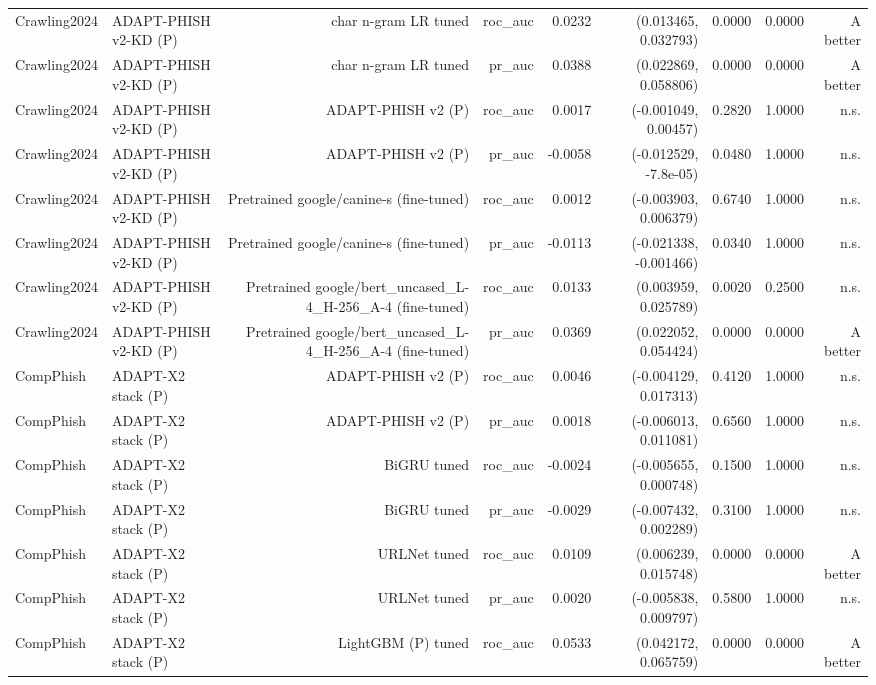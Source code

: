 \begin{table}[t]
\begin{tabular}{llrrrrrrr}
Crawling2024 & ADAPT-PHISH v2-KD (P) & char n-gram LR tuned & roc\_auc & 0.0232 & (0.013465, 0.032793) & 0.0000 & 0.0000 & A better \\
Crawling2024 & ADAPT-PHISH v2-KD (P) & char n-gram LR tuned & pr\_auc & 0.0388 & (0.022869, 0.058806) & 0.0000 & 0.0000 & A better \\
Crawling2024 & ADAPT-PHISH v2-KD (P) & ADAPT-PHISH v2 (P) & roc\_auc & 0.0017 & (-0.001049, 0.00457) & 0.2820 & 1.0000 & n.s. \\
Crawling2024 & ADAPT-PHISH v2-KD (P) & ADAPT-PHISH v2 (P) & pr\_auc & -0.0058 & (-0.012529, -7.8e-05) & 0.0480 & 1.0000 & n.s. \\
Crawling2024 & ADAPT-PHISH v2-KD (P) & Pretrained google/canine-s (fine-tuned) & roc\_auc & 0.0012 & (-0.003903, 0.006379) & 0.6740 & 1.0000 & n.s. \\
Crawling2024 & ADAPT-PHISH v2-KD (P) & Pretrained google/canine-s (fine-tuned) & pr\_auc & -0.0113 & (-0.021338, -0.001466) & 0.0340 & 1.0000 & n.s. \\
Crawling2024 & ADAPT-PHISH v2-KD (P) & Pretrained google/bert\_uncased\_L-4\_H-256\_A-4 (fine-tuned) & roc\_auc & 0.0133 & (0.003959, 0.025789) & 0.0020 & 0.2500 & n.s. \\
Crawling2024 & ADAPT-PHISH v2-KD (P) & Pretrained google/bert\_uncased\_L-4\_H-256\_A-4 (fine-tuned) & pr\_auc & 0.0369 & (0.022052, 0.054424) & 0.0000 & 0.0000 & A better \\
CompPhish & ADAPT-X2 stack (P) & ADAPT-PHISH v2 (P) & roc\_auc & 0.0046 & (-0.004129, 0.017313) & 0.4120 & 1.0000 & n.s. \\
CompPhish & ADAPT-X2 stack (P) & ADAPT-PHISH v2 (P) & pr\_auc & 0.0018 & (-0.006013, 0.011081) & 0.6560 & 1.0000 & n.s. \\
CompPhish & ADAPT-X2 stack (P) & BiGRU tuned & roc\_auc & -0.0024 & (-0.005655, 0.000748) & 0.1500 & 1.0000 & n.s. \\
CompPhish & ADAPT-X2 stack (P) & BiGRU tuned & pr\_auc & -0.0029 & (-0.007432, 0.002289) & 0.3100 & 1.0000 & n.s. \\
CompPhish & ADAPT-X2 stack (P) & URLNet tuned & roc\_auc & 0.0109 & (0.006239, 0.015748) & 0.0000 & 0.0000 & A better \\
CompPhish & ADAPT-X2 stack (P) & URLNet tuned & pr\_auc & 0.0020 & (-0.005838, 0.009797) & 0.5800 & 1.0000 & n.s. \\
CompPhish & ADAPT-X2 stack (P) & LightGBM (P) tuned & roc\_auc & 0.0533 & (0.042172, 0.065759) & 0.0000 & 0.0000 & A better \\

\end{tabular}
\end{table}
